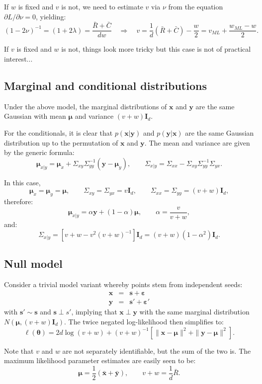 \documentclass{article}
\def\x{{\mathbf{x}}}
\def\y{{\mathbf{y}}}
\def\s{{\mathbf{s}}}
\def\I{{\mathbf{I}}}
\def\eps{{\boldsymbol{\varepsilon}}}
\def\m{{\boldsymbol{\mu}}}
\def\param{{\boldsymbol{\theta}}}
\begin{document}
If $w$ is fixed and $v$ is not, we need to estimate $v$ via $\nu$ from the equation $\partial L / \partial \nu = 0$, yielding:
$$
(1-2\nu)^{-1}
= (1+2\lambda)
= \frac{\bar{R} + \bar{C}}{dw}
\quad\Rightarrow\quad
v 
= \frac{1}{d}(\bar{R} + \bar{C}) - \frac{w}{2} 
= v_{ML} + \frac{w_{ML} - w}{2}.
$$

If $v$ is fixed and $w$ is not, things look more tricky but this case is not of practical interest... 



\subsection{Marginal and conditional distributions}

Under the above model, the marginal distributions of $\x$ and $\y$ are the same Gaussian with mean $\m$ and variance $(v+w)\I_d$.

For the conditionals, it is clear that $p(\x|\y)$ and $p(\y|\x)$ are the same Gaussian distribution up to the permutation of $\x$ and $\y$. The mean and variance are given by the generic formula:
$$
\m_{x|y} = \m_x + \Sigma_{xy}\Sigma_{yy}^{-1}(\y-\m_y),
\qquad
\Sigma_{x|y} = \Sigma_{xx} - \Sigma_{xy}\Sigma_{yy}^{-1}\Sigma_{yx}
.
$$

In this case, 
$$
\m_x=\m_y=\m,
\qquad
\Sigma_{xy}=\Sigma_{yx}=v\I_d,
\qquad
\Sigma_{xx}=\Sigma_{yy}=(v+w)\I_d,
$$
therefore:
$$
\m_{x|y} = \alpha\y + (1-\alpha)\m,
\qquad
\alpha = \frac{v}{v+w},
$$
and:
$$
\Sigma_{x|y}
=
[v+w - v^2 (v+w)^{-1}]\I_d
= 
(v+w) (1-\alpha^2) \I_d
.
$$


\subsection{Null model}

Consider a trivial model variant whereby points stem from independent seeds:
\begin{eqnarray*}
\x & = & \s + \eps\\
\y & = & \s' + \eps'
\end{eqnarray*}
with $\s'\sim \s$ and $\s\perp s'$, implying that $\x\perp \y$ with the same marginal distribution $N(\m, (v+w)\I_d)$. The twice negated log-likelihood then simplifies to:
$$
\ell(\param)
=
2d \log (v+w) 
+ (v+w)^{-1} \left[
\|\x-\m\|^2 + \|\y-\m\|^2 
\right]
.
$$

Note that $v$ and $w$ are not separately identifiable, but the sum of the two is. The maximum likelihood parameter estimates are easily seen to be:
$$
\m = \frac{1}{2} (\bar{\x} + \bar{\y}),
\qquad
v+w = \frac{1}{d} \bar{R} 
.
$$
\end{document}
